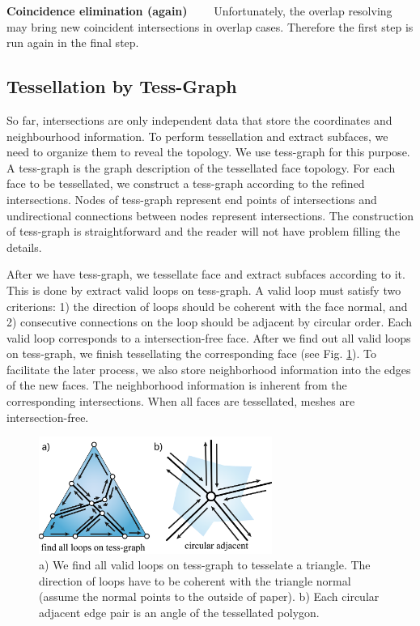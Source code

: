 \documentclass[10pt,journal,compsoc]{IEEEtran}
\begin{document}
\vspace{0.5em}
\noindent \textbf{Coincidence elimination (again)}~~~~
Unfortunately, the overlap resolving may bring new coincident intersections in overlap cases. Therefore the first step is run again in the final step.


\subsection{Tessellation by Tess-Graph}
\label{sec:tess}



So far, intersections are only independent data that store the coordinates and neighbourhood information. To perform tessellation and extract subfaces, we need to organize them to reveal the topology. We use tess-graph for this purpose. A tess-graph is the graph description of the tessellated face topology. For each face to be tessellated, we construct a tess-graph according to the refined intersections. Nodes of tess-graph represent end points of intersections and undirectional connections between nodes represent intersections. The construction of tess-graph is straightforward and the reader will not have problem filling the details.


After we have tess-graph, we tessellate face and extract subfaces according to it. This is done by extract valid loops on tess-graph. A valid loop must satisfy two criterions: 1) the direction of loops should be coherent with the face normal, and 2) consecutive connections on the loop should be adjacent by circular order. Each valid loop corresponds to a intersection-free face. After we find out all valid loops on tess-graph, we finish tessellating the corresponding face (see Fig. \ref{fig:cadj}). To facilitate the later process, we also store neighborhood information into the edges of the new faces. The neighborhood information is inherent from the corresponding intersections. When all faces are tessellated, meshes are intersection-free.

\begin{figure}[t]
\centering
\includegraphics[width=3in]{boolean-05}
\caption{a) We find all valid loops on tess-graph to tesselate a triangle. The direction of loops have to be coherent with the triangle normal (assume the normal points to the outside of paper). b) Each circular adjacent edge pair is an angle of the tessellated polygon.}
\label{fig:cadj}
\end{figure}
\end{document}
